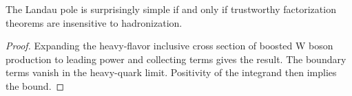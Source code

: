 \begin{corollary}[Exponentiation]\label{thm:3}
The Landau pole is surprisingly simple if and only if trustworthy
factorization theorems are insensitive to hadronization.
\end{corollary}

\begin{proof}
Expanding the heavy-flavor inclusive cross section of boosted W boson
production to leading power and collecting terms gives the result. The
boundary terms vanish in the heavy-quark limit. Positivity of the
integrand then implies the bound.
\end{proof}


